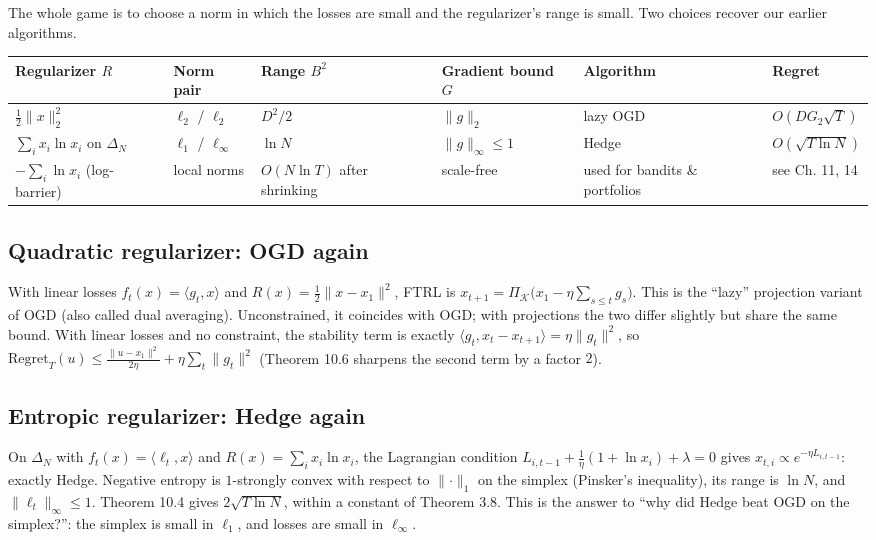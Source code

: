 \documentclass[11pt,a4paper,openany]{book}
\newcommand{\Reg}{\mathrm{Regret}}
\newcommand{\ip}[2]{\langle #1,#2\rangle}
\newcommand{\norm}[1]{\lVert #1\rVert}
\newcommand{\simplex}{\Delta}
\newcommand{\cK}{\mathcal{K}}
\begin{document}
The whole game is to choose a norm in which the losses are small and the regularizer's range is small. Two choices recover our earlier algorithms.

\begin{center}\small
\begin{tabularx}{\linewidth}{YYYYYl}
\toprule
\textbf{Regularizer $R$} & \textbf{Norm pair} & \textbf{Range $B^2$} & \textbf{Gradient bound $G$} & \textbf{Algorithm} & \textbf{Regret} \\
\midrule
$\tfrac12\norm{x}_2^2$ & $\ell_2$ / $\ell_2$ & $D^2/2$ & $\norm{g}_2$ & lazy OGD & $O(DG_2\sqrt T)$ \\
$\sum_ix_i\ln x_i$ on $\simplex_N$ & $\ell_1$ / $\ell_\infty$ & $\ln N$ & $\norm{g}_\infty\le1$ & Hedge & $O(\sqrt{T\ln N})$ \\
$-\sum_i\ln x_i$ (log-barrier) & local norms & $O(N\ln T)$ after shrinking & scale-free & used for bandits \& portfolios & see Ch. 11, 14 \\
\bottomrule
\end{tabularx}
\end{center}

\subsection*{Quadratic regularizer: OGD again}

With linear losses $f_t(x)=\ip{g_t}{x}$ and $R(x)=\frac12\norm{x-x_1}^2$, FTRL is $x_{t+1}=\Pi_\cK\big(x_1-\eta\sum_{s\le t}g_s\big)$. This is the ``lazy'' projection variant of OGD (also called dual averaging). Unconstrained, it coincides with OGD; with projections the two differ slightly but share the same bound. With linear losses and no constraint, the stability term is exactly $\ip{g_t}{x_t-x_{t+1}}=\eta\norm{g_t}^2$, so $\Reg_T(u)\le\frac{\norm{u-x_1}^2}{2\eta}+\eta\sum_t\norm{g_t}^2$ (Theorem 10.6 sharpens the second term by a factor $2$).

\subsection*{Entropic regularizer: Hedge again}

On $\simplex_N$ with $f_t(x)=\ip{\ell_t}{x}$ and $R(x)=\sum_ix_i\ln x_i$, the Lagrangian condition $L_{i,t-1}+\frac1\eta(1+\ln x_i)+\lambda=0$ gives $x_{t,i}\propto e^{-\eta L_{i,t-1}}$: exactly Hedge. Negative entropy is $1$-strongly convex with respect to $\norm\cdot_1$ on the simplex (Pinsker's inequality), its range is $\ln N$, and $\norm{\ell_t}_\infty\le1$. Theorem 10.4 gives $2\sqrt{T\ln N}$, within a constant of Theorem 3.8. This is the answer to ``why did Hedge beat OGD on the simplex?'': the simplex is small in $\ell_1$, and losses are small in $\ell_\infty$.
\end{document}
